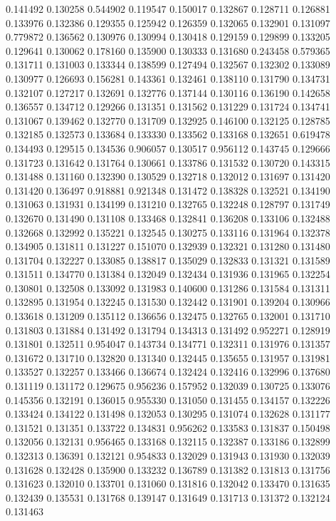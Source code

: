 0.141492
0.130258
0.544902
0.119547
0.150017
0.132867
0.128711
0.126881
0.133976
0.132386
0.129355
0.125942
0.126359
0.132065
0.132901
0.131097
0.779872
0.136562
0.130976
0.130994
0.130418
0.129159
0.129899
0.133205
0.129641
0.130062
0.178160
0.135900
0.130333
0.131680
0.243458
0.579365
0.131711
0.131003
0.133344
0.138599
0.127494
0.132567
0.132302
0.133089
0.130977
0.126693
0.156281
0.143361
0.132461
0.138110
0.131790
0.134731
0.132107
0.127217
0.132691
0.132776
0.137144
0.130116
0.136190
0.142658
0.136557
0.134712
0.129266
0.131351
0.131562
0.131229
0.131724
0.134741
0.131067
0.139462
0.132770
0.131709
0.132925
0.146100
0.132125
0.128785
0.132185
0.132573
0.133684
0.133330
0.133562
0.133168
0.132651
0.619478
0.134493
0.129515
0.134536
0.906057
0.130517
0.956112
0.143745
0.129666
0.131723
0.131642
0.131764
0.130661
0.133786
0.131532
0.130720
0.143315
0.131488
0.131160
0.132390
0.130529
0.132718
0.132012
0.131697
0.131420
0.131420
0.136497
0.918881
0.921348
0.131472
0.138328
0.132521
0.134190
0.131063
0.131931
0.134199
0.131210
0.132765
0.132248
0.128797
0.131749
0.132670
0.131490
0.131108
0.133468
0.132841
0.136208
0.133106
0.132488
0.132668
0.132992
0.135221
0.132545
0.130275
0.133116
0.131964
0.132378
0.134905
0.131811
0.131227
0.151070
0.132939
0.132321
0.131280
0.131480
0.131704
0.132227
0.133085
0.138817
0.135029
0.132833
0.131321
0.131589
0.131511
0.134770
0.131384
0.132049
0.132434
0.131936
0.131965
0.132254
0.130801
0.132508
0.133092
0.131983
0.140600
0.131286
0.131584
0.131311
0.132895
0.131954
0.132245
0.131530
0.132442
0.131901
0.139204
0.130966
0.133618
0.131209
0.135112
0.136656
0.132475
0.132765
0.132001
0.131710
0.131803
0.131884
0.131492
0.131794
0.134313
0.131492
0.952271
0.128919
0.131801
0.132511
0.954047
0.143734
0.134771
0.132311
0.131976
0.131357
0.131672
0.131710
0.132820
0.131340
0.132445
0.135655
0.131957
0.131981
0.133527
0.132257
0.133466
0.136674
0.132424
0.132416
0.132996
0.137680
0.131119
0.131172
0.129675
0.956236
0.157952
0.132039
0.130725
0.133076
0.145356
0.132191
0.136015
0.955330
0.131050
0.131455
0.134157
0.132226
0.133424
0.134122
0.131498
0.132053
0.130295
0.131074
0.132628
0.131177
0.131521
0.131351
0.133722
0.134831
0.956262
0.133583
0.131837
0.150498
0.132056
0.132131
0.956465
0.133168
0.132115
0.132387
0.133186
0.132899
0.132313
0.136391
0.132121
0.954833
0.132029
0.131943
0.131930
0.132039
0.131628
0.132428
0.135900
0.133232
0.136789
0.131382
0.131813
0.131756
0.131623
0.132010
0.133701
0.131060
0.131816
0.132042
0.133470
0.131635
0.132439
0.135531
0.131768
0.139147
0.131649
0.131713
0.131372
0.132124
0.131463
